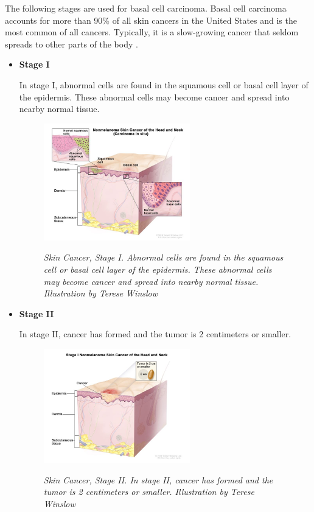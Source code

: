 The following stages are used for basal cell carcinoma. Basal cell carcinoma accounts for more than 90\% of all skin cancers in the United States and is the most common of all cancers. Typically, it is a slow-growing cancer that seldom spreads to other parts of the body \cite{CancerInstitute}. \\

\begin{itemize}

  \item \textbf{Stage I}

In stage I, abnormal cells are found in the squamous cell or basal cell layer of the epidermis. These abnormal cells may become cancer and spread into nearby normal tissue.

\begin{figure}[H]
\centering
\includegraphics[width=0.6\textwidth]{imatges/problem_domain/phase0-skin-cancer.jpg}
\caption[Skin Cancer, Stage I]{\textit{Skin Cancer, Stage I. Abnormal cells are found in the squamous cell or basal cell layer of the epidermis. These abnormal cells may become cancer and spread into nearby normal tissue. Illustration by Terese Winslow}}
{\label{fig:stage0-skin-canceer}}
\end{figure}

\newpage

 \item \textbf{Stage II}

In stage II, cancer has formed and the tumor is 2 centimeters or smaller.

\begin{figure}[H]
\centering
\includegraphics[width=0.6\textwidth]{imatges/problem_domain/stage1-skin-cancer.jpg}
\caption[Skin Cancer, Stage II]{\textit{Skin Cancer, Stage II. In stage II, cancer has formed and the tumor is 2 centimeters or smaller. Illustration by Terese Winslow}}
{\label{fig:stage1-skin-canceer}}
\end{figure}



\end{itemize}
